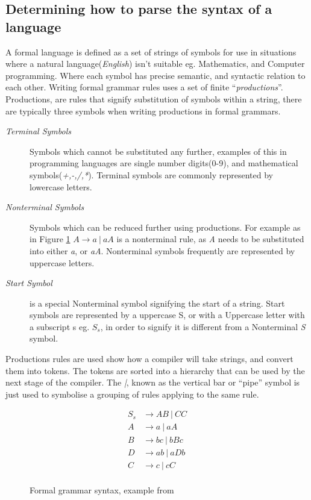 \subsection{Determining how to parse the syntax of a language}
A formal language is defined as a set of strings of symbols for use in situations where a natural language(\emph{English}) isn't suitable eg. Mathematics, and Computer programming. Where each symbol has precise semantic, and syntactic relation to each other. Writing formal grammar rules uses a set of finite ``\emph{productions}''. Productions, are rules that signify substitution of symbols within a string, there are typically three symbols when writing productions in formal grammars.
\begin{description}
    \item[\emph{Terminal Symbols}] Symbols which cannot be substituted any further, examples of this in programming languages are single number digits(0-9), and mathematical symbols(\emph{+,-,/,*}). Terminal symbols are commonly represented by lowercase letters.
    
    \item[\emph{Nonterminal Symbols}] Symbols which can be reduced further using productions. For example as in Figure \ref{fig:formalGrammar} $A \rightarrow a\ |\ aA$ is a nonterminal rule, as \emph{A} needs to be substituted into either \emph{a}, or \emph{aA}. Nonterminal symbols frequently are represented by uppercase letters.

    \item[\emph{Start Symbol}] is a special Nonterminal symbol signifying the start of a string. Start symbols are represented by a uppercase S, or with a Uppercase letter with a subscript s eg. $S_s$, in order to signify it is different from a Nonterminal \emph{S} symbol.
\end{description}
\newpage
Productions rules are used show how a compiler will take strings, and convert them into tokens. The tokens are sorted into a hierarchy that can be used by the next stage of the compiler. The \emph{|}, known as the vertical bar or ``pipe'' symbol is just used to symbolise a grouping of rules applying to the same rule.
\begin{figure}[ht!]
    \begin{align*}
    S_s &\rightarrow AB\ |\ CC \\
    A &\rightarrow a\ |\ aA \\
    B &\rightarrow bc\ |\ bBc \\
    D &\rightarrow ab\ |\ aDb \\
    C &\rightarrow c\ |\ cC \\
    \end{align*}
    \caption{Formal grammar syntax, example from \citep{ParseTech}}
    \label{fig:formalGrammar}
\end{figure}
\newpage
